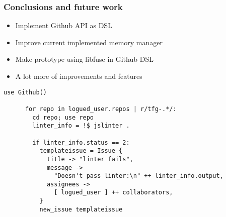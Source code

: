 \begin{frame}
  \frametitle{Conclusions and future work}
  \begin{center}
    \begin{itemize}
      \item Implement Github API as DSL
      \item Improve current implemented memory manager
      \item Make prototype using libfuse in Github DSL
      \item A lot more of improvements and features
    \end{itemize}
    \begin{lstlisting}[language=scriptflow2]
      use Github()

      for repo in logued_user.repos | r/tfg-.*/:
        cd repo; use repo
        linter_info = !$ jslinter .

        if linter_info.status == 2:
          templateissue = Issue {
            title -> "linter fails",
            message ->
              "Doesn't pass linter:\n" ++ linter_info.output,
            assignees ->
              [ logued_user ] ++ collaborators,
          }
          new_issue templateissue
    \end{lstlisting}
  \end{center}

\end{frame}
